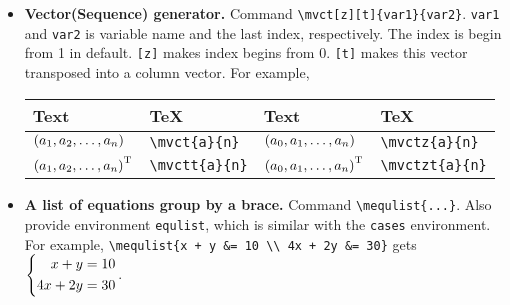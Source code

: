 \documentclass{article}
\begin{document}
\begin{itemize}
\item \textbf{Vector(Sequence) generator.} Command \lstinline`\mvct[z][t]{var1}{var2}`. \lstinline`var1` and \lstinline`var2` is variable name and the last index, respectively. The index is begin from 1 in default. \lstinline`[z]` makes index begins from 0. \lstinline`[t]` makes this vector transposed into a column vector. For example, 

\begin{tabular}{*{4}{l}}
\toprule
Text & \TeX & Text & \TeX \\
\midrule
${ ({a}_1, {a}_2, \ldots, {a}_{n}) }$ & \lstinline`\mvct{a}{n}` & ${ ({a}_0, {a}_1, \ldots, {a}_{n}) }$ & \lstinline`\mvctz{a}{n}` \\
${ { ({a}_1, {a}_2, \ldots, {a}_{n}) }^{\text T} }$ & \lstinline`\mvctt{a}{n}` & ${ { ({a}_0, {a}_1, \ldots, {a}_{n}) }^{\text T} }$ & \lstinline`\mvctzt{a}{n}` \\
\bottomrule
\end{tabular}

\item \textbf{A list of equations group by a brace.} Command \lstinline`\mequlist{...}`. Also provide environment \lstinline`equlist`, which is similar with the \lstinline`cases` environment. For example, \lstinline`\mequlist{x + y &= 10 \\ 4x + 2y &= 30}` gets ${\left\{ \begin{aligned} x + y &= 10 \\ 4x + 2y &= 30 \end{aligned} \right.}$.
\end{itemize}
\end{document}
